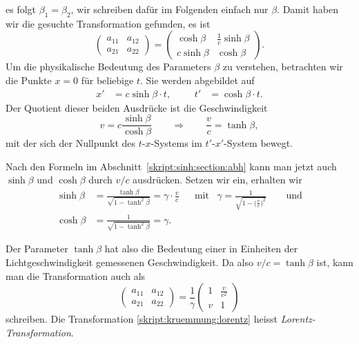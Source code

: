 es folgt $\beta_1=\beta_2$, wir schreiben dafür im Folgenden einfach
nur $\beta$.
Damit haben wir die gesuchte Transformation gefunden, es ist
\begin{equation}
\begin{pmatrix}
a_{11}&a_{12}\\
a_{21}&a_{22}
\end{pmatrix}
=
\begin{pmatrix}
 \cosh\beta&\frac1c\sinh\beta\\
c\sinh\beta&\cosh\beta
\end{pmatrix}.
\end{equation}
Um die physikalische Bedeutung des Parameters $\beta$ zu verstehen, 
betrachten wir die Punkte $x=0$ für beliebige $t$.
Sie werden abgebildet auf
\[
\begin{aligned}
x' &= c\sinh\beta \cdot t,
&
&&
t' &=  \cosh\beta \cdot t.
\end{aligned}
\]
Der Quotient dieser beiden Ausdrücke ist die Geschwindigkeit
\[
v = c\frac{\sinh\beta}{\cosh\beta}
\qquad\Rightarrow\qquad
\frac{v}{c}
=
\tanh\beta,
\]
mit der sich der Nullpunkt des $t$-$x$-Systems im $t'$-$x'$-System
bewegt.

Nach den Formeln im Abschnitt~\ref{skript:sinh:section:abh} kann 
man jetzt auch $\sinh\beta$ und $\cosh\beta$ durch $v/c$ ausdrücken.
Setzen wir ein, erhalten wir
\[
\begin{aligned}
\sinh\beta
&=
\frac{\tanh\beta}{\sqrt{1-\tanh^2\beta}}
=
\gamma\cdot\frac{v}{c}
&
&\text{mit}&
\gamma = \frac{1}{\displaystyle\sqrt{1-\biggl(\frac{v}{c}\biggr)^2}}
\qquad\text{und}
\\
\cosh\beta
&=
\frac1{\sqrt{1-\tanh^2\beta}}
=
\gamma.
\end{aligned}
\]

Der Parameter $\tanh\beta$ hat also die Bedeutung einer in Einheiten
der Lichtgeschwindigkeit gemessenen Geschwindigkeit.
Da also $v/c=\tanh\beta$ ist, kann man die Transformation auch
als
\begin{equation}
\begin{pmatrix}
a_{11}&a_{12}\\
a_{21}&a_{22}
\end{pmatrix}
=
\frac{1}{\gamma}
\begin{pmatrix}
\displaystyle 1
	& \displaystyle\frac{v}{c^2}
\\
\displaystyle v
	&\displaystyle 1
\end{pmatrix}
\label{skript:kruemmung:lorentz}
\end{equation}
schreiben.
Die Transformation 
\eqref{skript:kruemmung:lorentz}
heisst {\em Lorentz-Transformation}.
%

